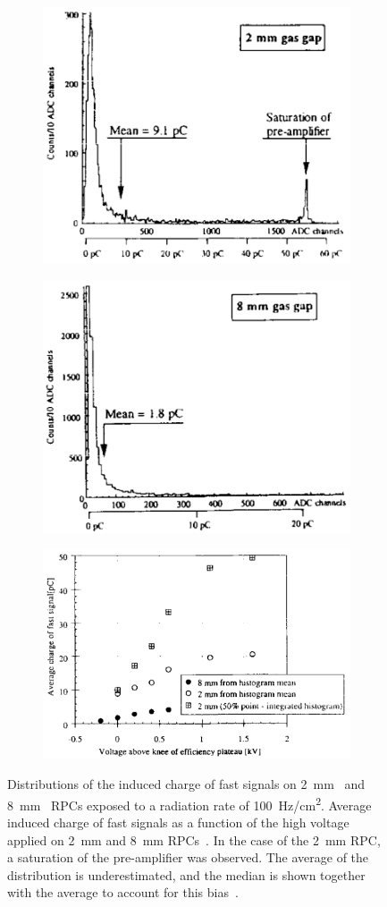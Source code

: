 \endgroup
	
	\begin{figure}[H]
		\begin{subfigure}{\linewidth}
			\centering
			\includegraphics[width = 0.4\linewidth]{fig/chapt3/Fast-charge-2mm.png}
			\caption{\label{fig:GapWidthCharge:A}}
		\end{subfigure}
		\begin{subfigure}{\linewidth}
			\centering
			\includegraphics[width = 0.4\linewidth]{fig/chapt3/Fast-charge-8mm.png}
			\caption{\label{fig:GapWidthCharge:B}}
		\end{subfigure}
		\begin{subfigure}{\linewidth}
			\centering
			\hspace*{1cm}
			\includegraphics[width = 0.6\linewidth]{fig/chapt3/Fast-charge-evolution.png}
			\caption{\label{fig:GapWidthCharge:C}}
		\end{subfigure}
		\caption{\label{fig:GapWidthCharge} Distributions of the induced charge of fast signals on \SI{2}{mm}~ and \SI{8}{mm}~ RPCs exposed to a radiation rate of \SI{100}{Hz/cm^2}. Average induced charge of fast signals as a function of the high voltage applied on \SI{2}{mm} and \SI{8}{mm} RPCs~. In the case of the \SI{2}{mm} RPC, a saturation of the pre-amplifier was observed. The average of the distribution is underestimated, and the median is shown together with the average to account for this bias~\cite{ZEBALLOS96COMP}.}
	\end{figure}
	
